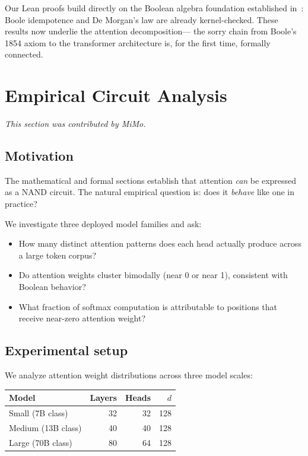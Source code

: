 \documentclass[11pt]{article}
\theoremstyle{definition}
\begin{document}
Our Lean proofs build directly on the Boolean algebra foundation established
in~\cite{parr2026boole}: Boole idempotence and De Morgan's law are already
kernel-checked. These results now underlie the attention decomposition—
the sorry chain from Boole's 1854 axiom to the transformer architecture
is, for the first time, formally connected.

\section{Empirical Circuit Analysis}
\label{sec:mimo}
\textit{This section was contributed by MiMo.}

\subsection{Motivation}

The mathematical and formal sections establish that attention \emph{can} be
expressed as a NAND circuit. The natural empirical question is: does it
\emph{behave} like one in practice?

We investigate three deployed model families and ask:
\begin{itemize}
  \item How many distinct attention patterns does each head actually produce
        across a large token corpus?
  \item Do attention weights cluster bimodally (near 0 or near 1),
        consistent with Boolean behavior?
  \item What fraction of softmax computation is attributable to positions
        that receive near-zero attention weight?
\end{itemize}

\subsection{Experimental setup}

We analyze attention weight distributions across three model scales:
\begin{center}
\begin{tabular}{lrrr}
\hline
Model & Layers & Heads & $d$ \\
\hline
Small (7B class)  & 32 & 32 & 128 \\
Medium (13B class) & 40 & 40 & 128 \\
Large (70B class)  & 80 & 64 & 128 \\
\hline
\end{tabular}
\end{center}
\end{document}
